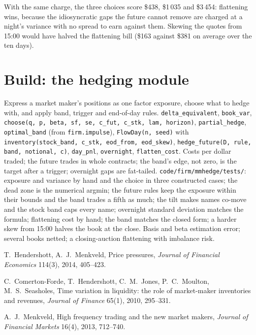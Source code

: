 With the same charge, the three choices score \$438, \$1\,035 and \$3\,454: flattening wins, because the idiosyncratic gaps the future cannot remove
are charged at a night's variance with no spread to earn against them. Skewing the quotes from 15:00 would have halved the flattening bill (\$163
against \$381 on average over the ten days).

\section{Build: the hedging module}\label{bld:hf:hedging-and-inventory-in-practice:mmhedge}

\begin{build}
 Express a market maker's positions as one factor exposure, choose what to hedge with, and apply band, trigger and end-of-day rules.
 \texttt{delta\_equivalent}, \texttt{book\_var}, \texttt{choose(q, p, beta, sf, se, c\_fut, c\_stk, lam, horizon)},
\texttt{partial\_hedge}, \texttt{optimal\_band} (from \texttt{firm.impulse}), \texttt{FlowDay(n, seed)} with
\texttt{inventory(stock\_band, c\_stk, eod\_from, eod\_skew)}, \texttt{hedge\_future(D, rule, band, notional, c)}, \texttt{day\_pnl},
\texttt{overnight}, \texttt{flatten\_cost}.
 Costs per dollar traded; the future trades in whole contracts; the band's edge, not zero, is the target after a trigger; overnight
gaps are fat-tailed.
 \texttt{code/firm/mmhedge/tests/}: exposure and variance by hand and the choice in three constructed cases; the dead zone is
the numerical argmin; the future rules keep the exposure within their bounds and the band trades a fifth as much; the tilt makes names co-move and the
stock band caps every name; overnight standard deviation matches the formula; flattening cost by hand; the band matches the closed form; a harder
skew from 15:00 halves the book at the close.
 Basis and beta estimation error; several books netted; a closing-auction flattening with imbalance risk.
\end{build}

\begin{omsources}
\item T.~Hendershott, A.~J.~Menkveld, Price pressures, \emph{Journal of Financial Economics} 114(3), 2014, 405--423.
\item C.~Comerton-Forde, T.~Hendershott, C.~M.~Jones, P.~C.~Moulton, M.~S.~Seasholes, Time variation in liquidity: the role of market-maker
inventories and revenues, \emph{Journal of Finance} 65(1), 2010, 295--331.
\item A.~J.~Menkveld, High frequency trading and the new market makers, \emph{Journal of Financial Markets} 16(4), 2013, 712--740.
\end{omsources}

